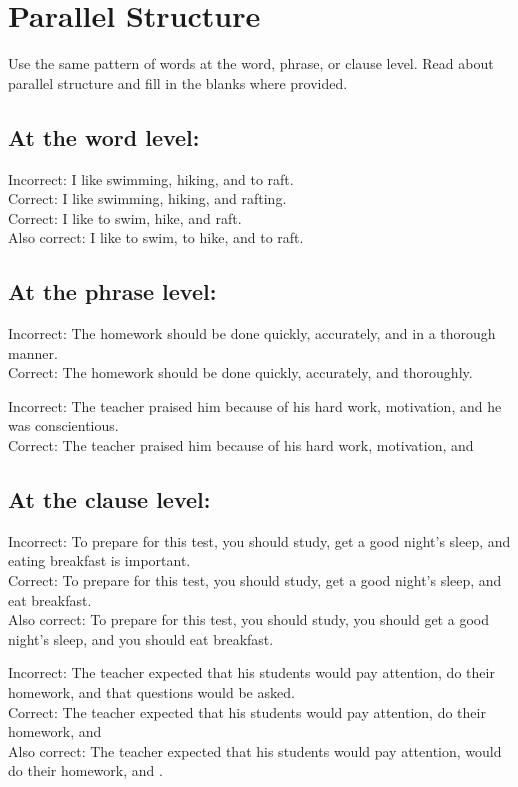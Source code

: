 \section{Parallel Structure}
Use the same pattern of words at the word, phrase, or clause level. Read about parallel structure and fill in the blanks where provided.

\subsection{At the word level:}
Incorrect: I like swimming, hiking, and to raft.\\
Correct: I like swimming, hiking, and rafting.\\
Correct:  I like to swim, hike, and raft.\\
Also correct:  I like to swim, to hike, and to raft.

\subsection{At the phrase level:}
Incorrect:  The homework should be done quickly, accurately, and in a thorough manner.\\
Correct: The homework should be done quickly, accurately, and thoroughly.

\bigskip
Incorrect:  The teacher praised him because of his hard work, motivation, and he was conscientious.\\
Correct: The teacher praised him because of his hard work, motivation, and
\longline   %

\subsection{At the clause level:}
Incorrect: To prepare for this test, you should study, get a good night's sleep, and eating breakfast is important. \\
Correct: To prepare for this test, you should study, get a good night's sleep, and eat breakfast.\\
Also correct:  To prepare for this test, you should study, you should get a good night's sleep, and you should eat breakfast.

\bigskip
Incorrect:  The teacher expected that his students would pay attention, do their homework, and that questions would be asked.\\
Correct:  The teacher expected that his students would pay attention, do their homework, and \hrulefill \\
Also correct:  The teacher expected that his students would pay attention, would do their homework, and \hrulefill.

